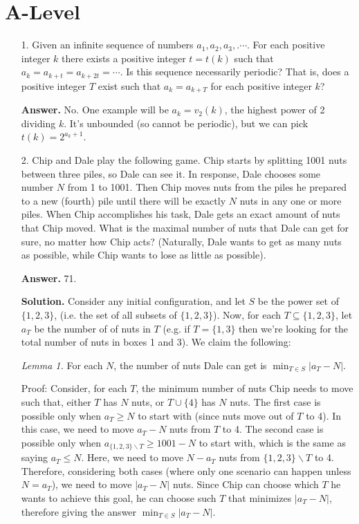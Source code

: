 \documentclass[11pt,a4paper]{article}
\begin{document}
\section*{A-Level}
\begin{enumerate}
	\item[1.] 
	Given an infinite sequence of numbers $a_1, a_2, a_3, .\cdots$.
	For each positive integer $k$ there exists a positive integer $t = t(k)$ such that 
	$a_k = a_{k+t} = a_{k+2t} = \cdots$. 
	Is this sequence necessarily periodic? 
	That is, does a positive integer $T$ exist such that $a_k = a_{k+T}$ for each positive
	integer $k$?
	
	\textbf{Answer.} No. 
	One example will be $a_k=v_2(k)$, 
	the highest power of 2 dividing $k$. 
	It's unbounded (so cannot be periodic), but we can pick $t(k)=2^{a_k+1}$. 
	
	\item [2.]
	Chip and Dale play the following game. Chip starts by splitting 1001 nuts between three
	piles, so Dale can see it. In response, Dale chooses some number $N$ from 1 to 1001. Then
	Chip moves nuts from the piles he prepared to a new (fourth) pile until there will be exactly
	$N$ nuts in any one or more piles. When Chip accomplishes his task, Dale gets an exact
	amount of nuts that Chip moved. What is the maximal number of nuts that Dale can get
	for sure, no matter how Chip acts? (Naturally, Dale wants to get as many nuts as possible,
	while Chip wants to lose as little as possible).
	
	\textbf{Answer.} 71. 
	
	\textbf{Solution.} 
	Consider any initial configuration, 
	and let $S$ be the power set of $\{1, 2, 3\}$, 
	(i.e. the set of  all subsets of $\{1, 2, 3\}$). 
	Now, for each $T\subseteq \{1, 2, 3\}$, 
	let $a_T$ be the number of  of nuts in $T$ 
	(e.g. if $T=\{1, 3\}$ then we're looking for the total number of nuts in boxes 1 and 3). 
	We claim the following: 
	
	\emph{Lemma 1.} For each $N$, the number of nuts Dale can get is $\min_{T\in S}|a_T-N|$. 
	
	Proof: Consider, for each $T$, the minimum number of nuts Chip needs to move such that, either $T$ has $N$ nuts, or $T\cup \{4\}$ has $N$ nuts. 
	The first case is possible only when $a_T\ge N$ to start with (since nuts move out of $T$ to 4). 
	In this case, we need to move $a_T-N$ nuts from $T$ to 4. 
	The second case is possible only when $a_{\{1, 2, 3\}\backslash T}\ge 1001 - N$ to start with, 
	which is the same as saying $a_T\le N$. 
	Here, we need to move $N-a_T$ nuts from $\{1, 2, 3\}\backslash T$ to 4. 
	Therefore, considering both cases (where only one scenario can happen unless $N=a_T$), 
	we need to move $|a_T-N|$ nuts. 
	Since Chip can choose which $T$ he wants to achieve this goal, he can choose such $T$ that minimizes $|a_T-N|$, 
	therefore giving the answer $\min_{T\in S}|a_T-N|$. 
	

\end{enumerate}
\end{document}

